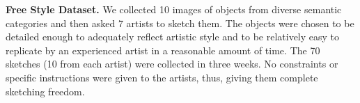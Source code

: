


\noindent\textbf{Free Style Dataset.} We collected 10 images of objects from diverse semantic categories and then asked 7 artists to sketch them. The objects were chosen to be detailed enough to adequately reflect artistic style and to be relatively easy to replicate by an experienced artist in a reasonable amount of time. The 70 sketches (10 from each artist) were collected in three weeks. No constraints or specific instructions were given to the artists, thus, giving them complete sketching freedom. 


